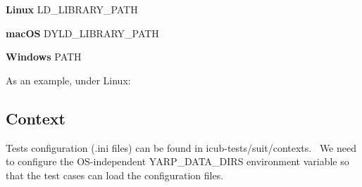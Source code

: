 \begin{DoxyItemize}
\item {\bfseries Linux} {\ttfamily L\+D\+\_\+\+L\+I\+B\+R\+A\+R\+Y\+\_\+\+P\+A\+TH} \item {\bfseries mac\+OS} {\ttfamily D\+Y\+L\+D\+\_\+\+L\+I\+B\+R\+A\+R\+Y\+\_\+\+P\+A\+TH} \item {\bfseries Windows} {\ttfamily P\+A\+TH}\end{DoxyItemize}
As an example, under Linux\+: 
\hypertarget{installation_context}{}\subsection{Context}\label{installation_context}
Tests configuration (.ini files) can be found in {\ttfamily icub-\/tests/suit/contexts}.~\newline
We need to configure the O\+S-\/independent {\ttfamily Y\+A\+R\+P\+\_\+\+D\+A\+T\+A\+\_\+\+D\+I\+RS} environment variable so that the test cases can load the configuration files.


 